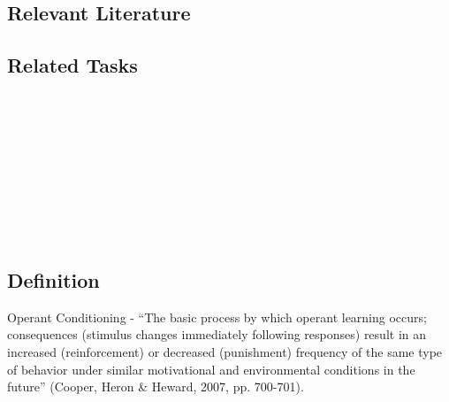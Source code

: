 \subsection{Relevant Literature}
\begin{refsection}
\nocite{test,alang2017police,clayton2018black}
\printbibliography[heading=none]
\end{refsection}
%
\subsection{Related Tasks}
\fourFKTen{}\\
\fourFKThirteen{}\\
\fourFKFifteen{}\\
\fourFKSixteen{}\\
\fourFKSeventeen{}\\
\fourFKTwentyFour{}\\
\fourFKTwentySix{}\\
\fourFKThirtyFive{}\\
%
%
%
%
%
\section{\fourFKFifteen{}}
\subsection{Definition}
Operant Conditioning - ``The basic process by which operant learning occurs; consequences (stimulus changes immediately following responses) result in an increased (reinforcement) or decreased (punishment) frequency of the same type of behavior under similar motivational and environmental conditions in the future'' (Cooper, Heron \& Heward, 2007, pp. 700-701).
%
